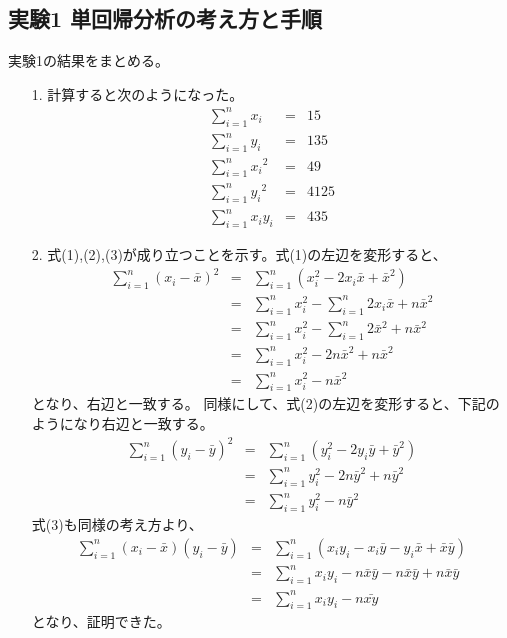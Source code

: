 \documentclass[12pt]{jarticle}
\begin{document}
\subsection{実験1 単回帰分析の考え方と手順}
\begin{shadebox}
    実験1の結果をまとめる。
\end{shadebox}
\begin{itemize}
    \item [1.]計算すると次のようになった。
          \begin{eqnarray}
              \sum_{i=1}^{n} x_i&=&15 \nonumber\\
              \sum_{i=1}^{n} y_i&=&135 \nonumber\\
              \sum_{i=1}^{n} {x_i}^2&=&49 \nonumber\\
              \sum_{i=1}^{n} {y_i}^2&=&4125 \nonumber\\
              \sum_{i=1}^{n} x_iy_i&=&435 \nonumber
          \end{eqnarray}
    \item [2.]式(1),(2),(3)が成り立つことを示す。式(1)の左辺を変形すると、
          \begin{eqnarray}
              \sum_{i=1}^{n} (x_i-\bar{x})^2&=&\sum_{i=1}^{n} (x_i^2-2x_i\bar{x}+\bar{x}^2) \nonumber\\
              &=&\sum_{i=1}^{n} x_i^2-\sum_{i=1}^{n} 2x_i\bar{x}+n\bar{x}^2 \nonumber\\
              &=&\sum_{i=1}^{n} x_i^2-\sum_{i=1}^{n} 2\bar{x}^2+n\bar{x}^2 \nonumber \\
              &=&\sum_{i=1}^{n} x_i^2-2n\bar{x}^2+n\bar{x}^2 \nonumber \\
              &=&\sum_{i=1}^{n} x_i^2-n\bar{x}^2 \nonumber
          \end{eqnarray}
          となり、右辺と一致する。
          同様にして、式(2)の左辺を変形すると、下記のようになり右辺と一致する。
          \begin{eqnarray}
              \sum_{i=1}^{n} (y_i-\bar{y})^2&=&\sum_{i=1}^{n} (y_i^2-2y_i\bar{y}+\bar{y}^2) \nonumber\\
              &=&\sum_{i=1}^{n} y_i^2-2n\bar{y}^2+n\bar{y}^2 \nonumber \\
              &=&\sum_{i=1}^{n} y_i^2-n\bar{y}^2 \nonumber
          \end{eqnarray}
          式(3)も同様の考え方より、
          \begin{eqnarray}
              \sum_{i=1}^{n} (x_i-\bar{x})(y_i-\bar{y})&=& \sum_{i=1}^{n} (x_iy_i-x_i\bar{y}-y_i\bar{x}+\bar{x}\bar{y}) \nonumber \\
              &=& \sum_{i=1}^{n} x_iy_i-n\bar{x}\bar{y}-n\bar{x}\bar{y}+n\bar{x}\bar{y} \nonumber \\
              &=&   \sum_{i=1}^{n} {x_iy_i}-n\bar{xy} \nonumber
          \end{eqnarray}
          となり、証明できた。


\end{itemize}
\end{document}
